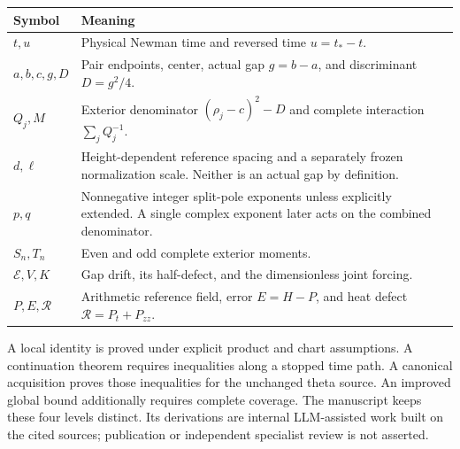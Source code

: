 \begin{center}
\begin{tabular}{>{\raggedright\arraybackslash}p{}
                >{\raggedright\arraybackslash}p{}}
\toprule
Symbol & Meaning \\
\midrule
$t,u$ & Physical Newman time and reversed time $u=t_*-t$. \\
$a,b,c,g,D$ & Pair endpoints, center, actual gap $g=b-a$, and discriminant $D=g^2/4$. \\
$Q_j,M$ & Exterior denominator $(\rho_j-c)^2-D$ and complete interaction $\sum_j Q_j^{-1}$. \\
$d,\ell$ & Height-dependent reference spacing and a separately frozen normalization scale. Neither is an actual gap by definition. \\
$p,q$ & Nonnegative integer split-pole exponents unless explicitly extended. A single complex exponent later acts on the combined denominator. \\
$S_n,T_n$ & Even and odd complete exterior moments. \\
$\mathcal E,V,K$ & Gap drift, its half-defect, and the dimensionless joint forcing. \\
$P,E,\mathcal R$ & Arithmetic reference field, error $E=H-P$, and heat defect $\mathcal R=P_t+P_{zz}$. \\
\bottomrule
\end{tabular}
\end{center}

A local identity is proved under explicit product and chart assumptions.
A continuation theorem requires inequalities along a stopped time path.
A canonical acquisition proves those inequalities for the unchanged theta
source. An improved global bound additionally requires complete coverage.
The manuscript keeps these four levels distinct. Its derivations are
internal LLM-assisted work built on the cited sources; publication or
independent specialist review is not asserted.
